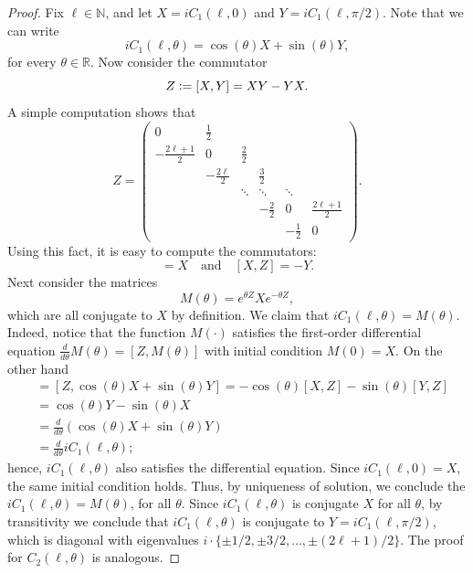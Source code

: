 \documentclass[11pt]{amsart}
\numberwithin{theorem}{section}
\numberwithin{equation}{section}
\theoremstyle{definition}
\numberwithin{example}{section}
\theoremstyle{definition}
\theoremstyle{definition}
\newcommand{\R}{\mathbb{R}}
\newcommand{\N}{\mathbb{N}}
\newcommand{\defeq}{\vcentcolon=}
\begin{document}
\begin{proof} 
    Fix $\ell\in\N$, and let $X=iC_1(\ell,0)$ and $Y=i C_1(\ell,\pi/2)$. Note that we can write
    \begin{equation*}
        iC_1(\ell,\theta)=\cos(\theta)X+\sin(\theta)Y,
    \end{equation*}
    for every $\theta\in\R$.
    Now consider the commutator
    \begin{equation*}
        Z\defeq[X,Y]=XY-YX.
    \end{equation*}
    A simple computation shows that
    \begin{equation*}
        Z=\begin{pmatrix}
        0 & \frac{1}{2}&\\
        -\frac{2\ell+1}{2} &0&\frac{2}{2}&\\
        & -\frac{2\ell}{2}&&\frac{3}{2}& \\
        &&\ddots&\ddots&\ddots&\\
    &&& -\frac{2}{2}&0&\frac{2\ell+1}{2}\\
        & &&& -\frac{1}{2}&0
    \end{pmatrix}.
    \end{equation*}
Using this fact, it is easy to compute the commutators:
\begin{equation*}
    [Y,Z]=X\quad\text{and}\quad [X,Z]=-Y.
\end{equation*}
    Next consider the matrices
    \begin{equation*}
        M(\theta)=e^{\theta Z}Xe^{-\theta Z},
    \end{equation*}
    which are all conjugate to $X$ by definition. We claim that $iC_1(\ell,\theta)=M(\theta)$. Indeed, notice that the function $M(\cdot)$ satisfies the first-order differential equation $\frac{d}{d\theta}M(\theta)=[Z,M(\theta)]$ with initial condition $M(0)=X$. On the other hand
    \begin{align*}
        [Z,iC_1(\ell,\theta)]&=[Z,\cos(\theta)X+\sin(\theta)Y]=-\cos(\theta)[X,Z]-\sin(\theta)[Y,Z]\\
        &=\cos(\theta)Y-\sin(\theta)X\\
        &=\frac{d}{d\theta}\left(\cos(\theta)X+\sin(\theta)Y\right)\\
        &=\frac{d}{d\theta}iC_1(\ell,\theta);
    \end{align*}
    hence, $iC_1(\ell,\theta)$ also satisfies the differential equation. Since $iC_1(\ell,0)=X$, the same initial condition holds. Thus, by uniqueness of solution, we conclude the $iC_1(\ell,\theta)=M(\theta)$, for all $\theta$. Since $iC_1(\ell,\theta)$ is conjugate $X$ for all $\theta$, by transitivity we conclude that $i C_1(\ell,\theta)$ is conjugate to $Y=iC_1(\ell,\pi/2)$, which is diagonal with eigenvalues  $i\cdot\{\pm 1/2,\pm 3/2,\dots,\pm (2\ell+1)/2\}$. The proof for $C_2(\ell,\theta)$ is analogous.
\end{proof}
\end{document}
